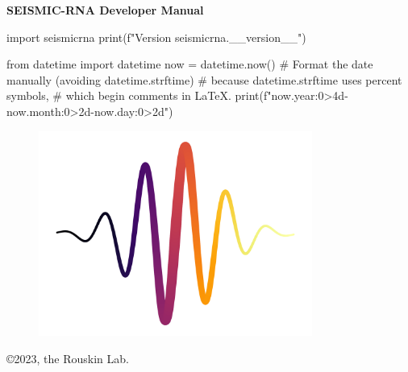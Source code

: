 \documentclass[main.tex]{subfiles}
\begin{document}
\begin{titlepage}


\begin{center}

\huge
\textbf{SEISMIC-RNA Developer Manual}
\normalsize

\vspace{0.5cm}

\Large
\begin{python}
import seismicrna
print(f"Version {seismicrna.__version__}")
\end{python}
\normalsize

\vspace{0.25cm}

\Large
\begin{python}
from datetime import datetime
now = datetime.now()
# Format the date manually (avoiding datetime.strftime)
# because datetime.strftime uses percent symbols,
# which begin comments in LaTeX.
print(f"{now.year:0>4d}-{now.month:0>2d}-{now.day:0>2d}")
\end{python}
\normalsize

\end{center}

\vspace{1cm}


\begin{figure}[h]
    \includegraphics[width=0.8\textwidth, center]{../../../logo.png}
\end{figure}

\vfill



\noindent
\copyright 2023, the Rouskin Lab.

\vspace{0.5cm}


\end{titlepage}
\end{document}

